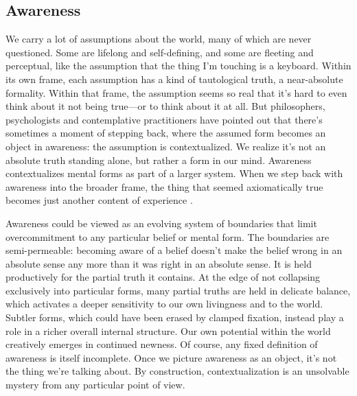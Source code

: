 \documentclass[12pt]{article}
\begin{document}
\subsection{Awareness}


We carry a lot of assumptions about the world, many of which are never questioned. Some are lifelong and self-defining, and some are fleeting and perceptual, like the assumption that the thing I'm touching is a keyboard. Within its own frame, each assumption has a kind of tautological truth, a near-absolute formality. Within that frame, the assumption seems so real that it's hard to even think about it not being true---or to think about it at all. But philosophers, psychologists and contemplative practitioners have pointed out that there's sometimes a moment of stepping back, where the assumed form becomes an object in awareness: the assumption is contextualized. We realize it's not an absolute truth standing alone, but rather a form in our mind. Awareness contextualizes mental forms as part of a larger system. When we step back with awareness into the broader frame, the thing that seemed axiomatically true becomes just another content of experience \citep{watts2011wisdom, jung1969archetypes, bodhi2000connected, wegner1994ironic,beisser1970paradoxical, wilber1996atman, suzuki1970zen, krishnamurti1969freedom, k2025harmony, kegan1982evolving}. 




Awareness could be viewed as an evolving system of boundaries that limit overcommitment to any particular belief or mental form. The boundaries are semi-permeable: becoming aware of a belief doesn't make the belief wrong in an absolute sense any more than it was right in an absolute sense. It is held productively for the partial truth it contains. At the edge of not collapsing exclusively into particular forms, many partial truths are held in delicate balance, which activates a deeper sensitivity to our own livingness and to the world. Subtler forms, which could have been erased by clamped fixation, instead play a role in a richer overall internal structure. Our own potential within the world creatively emerges in continued newness. Of course, any fixed definition of awareness is itself incomplete. Once we picture awareness as an object, it's not the thing we're talking about. By construction, contextualization is an unsolvable mystery from any particular point of view.
\end{document}
